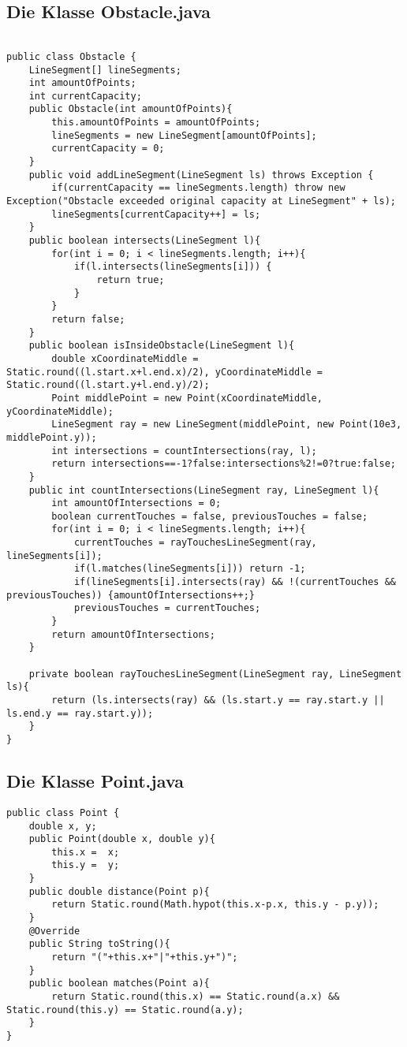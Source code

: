 \documentclass[a4paper,10pt,ngerman]{scrartcl}
\begin{document}
 \subsection{Die Klasse Obstacle.java}
 \begin{lstlisting}[frame=single]
 
public class Obstacle {
    LineSegment[] lineSegments;
    int amountOfPoints;
    int currentCapacity;
    public Obstacle(int amountOfPoints){
        this.amountOfPoints = amountOfPoints;
        lineSegments = new LineSegment[amountOfPoints];
        currentCapacity = 0;
    }
    public void addLineSegment(LineSegment ls) throws Exception {
        if(currentCapacity == lineSegments.length) throw new Exception("Obstacle exceeded original capacity at LineSegment" + ls);
        lineSegments[currentCapacity++] = ls;
    }
    public boolean intersects(LineSegment l){
        for(int i = 0; i < lineSegments.length; i++){
            if(l.intersects(lineSegments[i])) {
                return true;
            }
        }
        return false;
    }
    public boolean isInsideObstacle(LineSegment l){
        double xCoordinateMiddle = Static.round((l.start.x+l.end.x)/2), yCoordinateMiddle = Static.round((l.start.y+l.end.y)/2);
        Point middlePoint = new Point(xCoordinateMiddle, yCoordinateMiddle);
        LineSegment ray = new LineSegment(middlePoint, new Point(10e3, middlePoint.y));
        int intersections = countIntersections(ray, l);
        return intersections==-1?false:intersections%2!=0?true:false;
    }
    public int countIntersections(LineSegment ray, LineSegment l){
        int amountOfIntersections = 0;
        boolean currentTouches = false, previousTouches = false;
        for(int i = 0; i < lineSegments.length; i++){
            currentTouches = rayTouchesLineSegment(ray, lineSegments[i]);
            if(l.matches(lineSegments[i])) return -1;
            if(lineSegments[i].intersects(ray) && !(currentTouches && previousTouches)) {amountOfIntersections++;}
            previousTouches = currentTouches;
        }
        return amountOfIntersections;
    }
    
    private boolean rayTouchesLineSegment(LineSegment ray, LineSegment ls){
        return (ls.intersects(ray) && (ls.start.y == ray.start.y || ls.end.y == ray.start.y));
    }
}
 \end{lstlisting}
 \subsection{Die Klasse Point.java}
\begin{lstlisting}[frame=single]
public class Point {
    double x, y;
    public Point(double x, double y){
        this.x =  x;
        this.y =  y;
    }
    public double distance(Point p){
        return Static.round(Math.hypot(this.x-p.x, this.y - p.y));
    }
    @Override
    public String toString(){
        return "("+this.x+"|"+this.y+")";
    }
    public boolean matches(Point a){
        return Static.round(this.x) == Static.round(a.x) && Static.round(this.y) == Static.round(a.y);
    }
}
\end{lstlisting}
\end{document}
